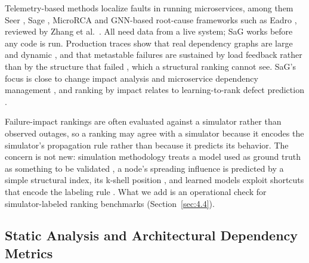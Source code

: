 \documentclass[preprint,3p]{elsarticle}
\begin{document}
Telemetry-based methods localize faults in running microservices, among them Seer \cite{gan2019seer}, Sage \cite{gan2021sage}, MicroRCA \cite{wu2020microrca} and GNN-based root-cause frameworks such as Eadro \cite{lee2023eadro}, reviewed by Zhang et al.~\cite{zhang2024failurediag}. All need data from a live system; SaG works before any code is run. Production traces show that real dependency graphs are large and dynamic \cite{luo2021alibaba}, and that metastable failures are sustained by load feedback rather than by the structure that failed \cite{bronson2021metastable,huang2022metastable}, which a structural ranking cannot see. SaG's focus is close to change impact analysis \cite{bohner1996impact} and microservice dependency management \cite{esparrachiari2018tracking}, and ranking by impact relates to learning-to-rank defect prediction \cite{yang2015ltr}.

Failure-impact rankings are often evaluated against a simulator rather than observed outages, so a ranking may agree with a simulator because it encodes the simulator's propagation rule rather than because it predicts its behavior. The concern is not new: simulation methodology treats a model used as ground truth as something to be validated \cite{sargent2013verification}, a node's spreading influence is predicted by a simple structural index, its k-shell position \cite{kitsak2010influential}, and learned models exploit shortcuts that encode the labeling rule \cite{geirhos2020shortcut,kapoor2023leakage}. What we add is an operational check for simulator-labeled ranking benchmarks (Section~\ref{sec:4.4}).

\subsection{Static Analysis and Architectural Dependency Metrics}
\label{sec:2.2}
\end{document}
